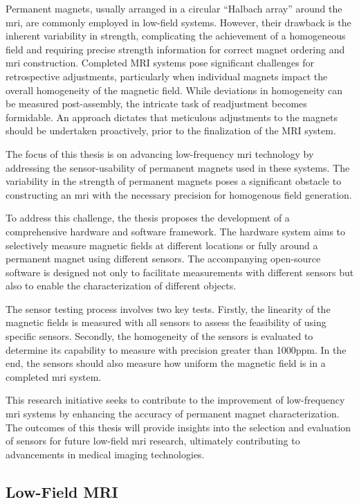 Permanent magnets, usually arranged in a circular ``Halbach array''
around the \gls{mri}, are commonly employed in low-field systems.
However, their drawback is the inherent variability in strength,
complicating the achievement of a homogeneous field and requiring
precise strength information for correct magnet ordering and \gls{mri}
construction. Completed MRI systems pose significant challenges for
retrospective adjustments, particularly when individual magnets impact
the overall homogeneity of the magnetic field. While deviations in
homogeneity can be measured post-assembly, the intricate task of
readjustment becomes formidable. An approach dictates that meticulous
adjustments to the magnets should be undertaken proactively, prior to
the finalization of the MRI system.

The focus of this thesis is on advancing low-frequency \gls{mri}
technology by addressing the sensor-usability of permanent magnets used
in these systems. The variability in the strength of permanent magnets
poses a significant obstacle to constructing an \gls{mri} with the
necessary precision for homogenous field generation.

To address this challenge, the thesis proposes the development of a
comprehensive hardware and software framework. The hardware system aims
to selectively measure magnetic fields at different locations or fully
around a permanent magnet using different sensors. The accompanying
open-source software is designed not only to facilitate measurements
with different sensors but also to enable the characterization of
different objects.

The sensor testing process involves two key tests. Firstly, the
linearity of the magnetic fields is measured with all sensors to assess
the feasibility of using specific sensors. Secondly, the homogeneity of
the sensors is evaluated to determine its capability to measure with
precision greater than 1000\gls{ppm}. In the end, the sensors should
also measure how uniform the magnetic field is in a completed \gls{mri}
system.

This research initiative seeks to contribute to the improvement of
low-frequency \gls{mri} systems by enhancing the accuracy of permanent
magnet characterization. The outcomes of this thesis will provide
insights into the selection and evaluation of sensors for future
low-field \gls{mri} research, ultimately contributing to advancements in
medical imaging technologies.

\hypertarget{low-field-mri}{%
\subsection{Low-Field MRI}\label{low-field-mri}}

